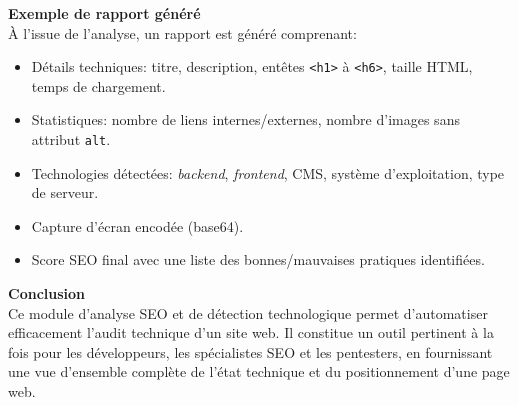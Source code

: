 \begin{justify}
\vspace{0.3cm}
{\fontsize{14}{17}\selectfont \textbf{Exemple de rapport généré}}\\
À l’issue de l’analyse, un rapport est généré comprenant:
\begin{itemize}[label=$\bullet$]
    \item Détails techniques: titre, description, entêtes \texttt{<h1>} à \texttt{<h6>}, taille HTML, temps de chargement.
    \item Statistiques: nombre de liens internes/externes, nombre d’images sans attribut \texttt{alt}.
    \item Technologies détectées: \textit{backend}, \textit{frontend}, CMS, système d’exploitation, type de serveur.
    \item Capture d’écran encodée (base64).
    \item Score SEO final avec une liste des bonnes/mauvaises pratiques identifiées.
\end{itemize}

\vspace{0.3cm}
{\fontsize{14}{17}\selectfont \textbf{Conclusion}}\\
Ce module d’analyse SEO et de détection technologique permet d’automatiser efficacement l’audit technique d’un site web. Il constitue un outil pertinent à la fois pour les développeurs, les spécialistes SEO et les pentesters, en fournissant une vue d’ensemble complète de l’état technique et du positionnement d’une page web.
\end{justify}
